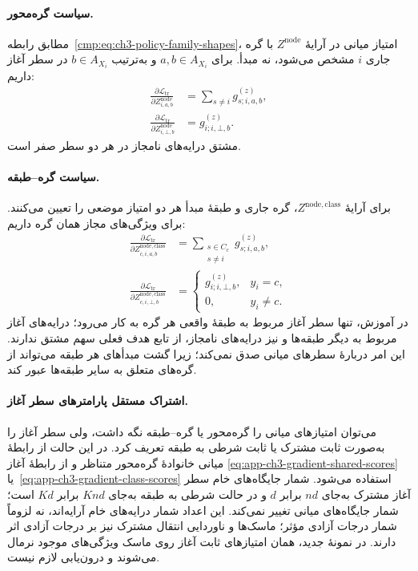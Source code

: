 \paragraph{سیاست گره‌محور.}
مطابق رابطه~\eqref{cmp:eq:ch3-policy-family-shapes}،
امتیاز میانی در آرایهٔ $Z^{\mathrm{node}}$
با گره جاری $i$ مشخص می‌شود، نه مبدأ.
برای $a,b\in A_{X_i}$ و به‌ترتیب
$b\in A_{X_i}$ در سطر آغاز داریم:
\begin{equation}\label{eq:app-ch3-gradient-node-scores}
\begin{aligned}
\frac{\partial\mathcal L_{\mathrm{tr}}}
{\partial Z^{\mathrm{node}}_{i,a,b}}
&=\sum_{s\ne i}g_{s;i,a,b}^{(z)},\\
\frac{\partial\mathcal L_{\mathrm{tr}}}
{\partial Z^{\mathrm{node}}_{i,\bot,b}}
&=g_{i;i,\bot,b}^{(z)}.
\end{aligned}
\end{equation}
مشتق درایه‌های نامجاز در هر دو سطر صفر است.

\paragraph{سیاست گره--طبقه.}
برای آرایهٔ $Z^{\mathrm{node,class}}$،
گره جاری و طبقهٔ مبدأ هر دو امتیاز
موضعی را تعیین می‌کنند. برای ویژگی‌های
مجاز همان گره داریم:
\begin{equation}\label{eq:app-ch3-gradient-node-class-scores}
\begin{aligned}
\frac{\partial\mathcal L_{\mathrm{tr}}}
{\partial Z^{\mathrm{node,class}}_{c,i,a,b}}
&=\sum_{\substack{s\in C_c\\s\ne i}}
g_{s;i,a,b}^{(z)},\\
\frac{\partial\mathcal L_{\mathrm{tr}}}
{\partial Z^{\mathrm{node,class}}_{c,i,\bot,b}}
&=\begin{cases}
g_{i;i,\bot,b}^{(z)},&y_i=c,\\
0,&y_i\ne c.
\end{cases}
\end{aligned}
\end{equation}
در آموزش، تنها سطر آغاز مربوط به طبقهٔ
واقعی هر گره به کار می‌رود؛ درایه‌های
آغاز مربوط به دیگر طبقه‌ها و نیز درایه‌های
نامجاز، از تابع هدف فعلی سهم مشتق ندارند.
این امر دربارهٔ سطرهای میانی صدق نمی‌کند؛
زیرا گشت مبدأهای هر طبقه می‌تواند از
گره‌های متعلق به سایر طبقه‌ها عبور کند.

\paragraph{اشتراک مستقل پارامترهای سطر آغاز.}
می‌توان امتیازهای میانی را گره‌محور یا
گره--طبقه نگه داشت، ولی سطر آغاز را به‌صورت
ثابت مشترک یا ثابت شرطی به طبقه تعریف کرد.
در این حالت از رابطهٔ میانی خانوادهٔ
گره‌محور متناظر و از رابطهٔ آغاز
\eqref{eq:app-ch3-gradient-shared-scores}
یا~\eqref{eq:app-ch3-gradient-class-scores}
استفاده می‌شود. شمار جایگاه‌های خام سطر
آغاز مشترک به‌جای $nd$ برابر $d$ و در
حالت شرطی به طبقه به‌جای $Knd$ برابر
$Kd$ است؛ شمار جایگاه‌های میانی تغییر
نمی‌کند. این اعداد شمار درایه‌های خام
آرایه‌اند، نه لزوماً شمار درجات آزادی مؤثر؛
ماسک‌ها و ناوردایی انتقال مشترک نیز بر
درجات آزادی اثر دارند. در نمونهٔ جدید،
همان امتیازهای ثابت آغاز روی ماسک ویژگی‌های
موجود نرمال می‌شوند و درون‌یابی لازم نیست.

